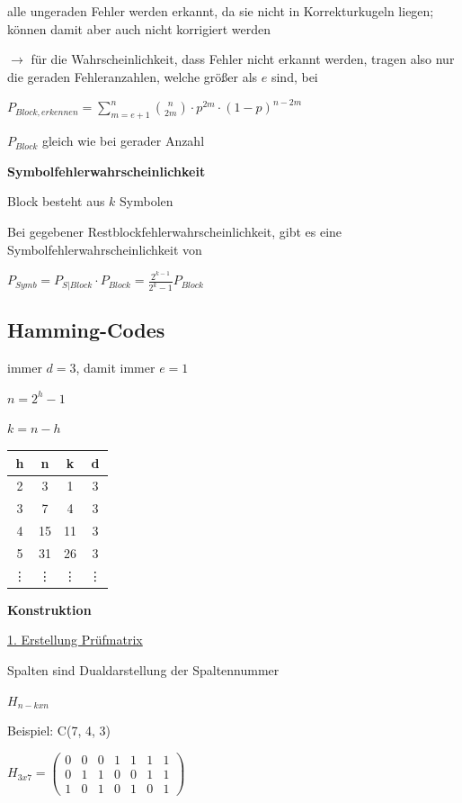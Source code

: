 alle ungeraden Fehler werden erkannt, da sie nicht in Korrekturkugeln liegen; können damit aber auch
nicht korrigiert werden

$\rightarrow$ für die Wahrscheinlichkeit, dass Fehler nicht erkannt werden, tragen also nur die geraden Fehleranzahlen, welche größer als $e$ sind, bei

$\displaystyle{
    P_{Block,erkennen} = \sum_{m=e+1}^{n} \binom{n}{2m} \cdot p^{2m} \cdot (1 - p)^{n-2m}
}$

$P_{Block}$ gleich wie bei gerader Anzahl

\textbf{Symbolfehlerwahrscheinlichkeit}

Block besteht aus $k$ Symbolen

Bei gegebener Restblockfehlerwahrscheinlichkeit, gibt es eine Symbolfehlerwahrscheinlichkeit von

$\displaystyle{
    P_{Symb} = P_{S|Block} \cdot P_{Block} = \frac{2^{k-1}}{2^k - 1} P_{Block}
}$

\subsection{Hamming-Codes}

immer $d=3$, damit immer $e=1$

$\displaystyle{
    n = 2^h - 1
}$

$\displaystyle{
    k = n - h
}$

\begin{tabular}{c|c c c}
    h & n & k & d\\
    \hline
    2 & 3 & 1 & 3\\
    3 & 7 & 4 & 3\\
    4 & 15 & 11 & 3\\
    5 & 31 & 26 & 3\\
    \vdots & \vdots & \vdots & \vdots
\end{tabular}

\textbf{Konstruktion}

\underline{1. Erstellung Prüfmatrix}

Spalten sind Dualdarstellung der Spaltennummer

$H_{n-k x n}$

Beispiel: C(7, 4, 3)

$\displaystyle{
    H_{3 x 7} = \begin{pmatrix}
        0 & 0 & 0 & 1 & 1 & 1 & 1\\
        0 & 1 & 1 & 0 & 0 & 1 & 1\\
        1 & 0 & 1 & 0 & 1 & 0 & 1
    \end{pmatrix}
}$

